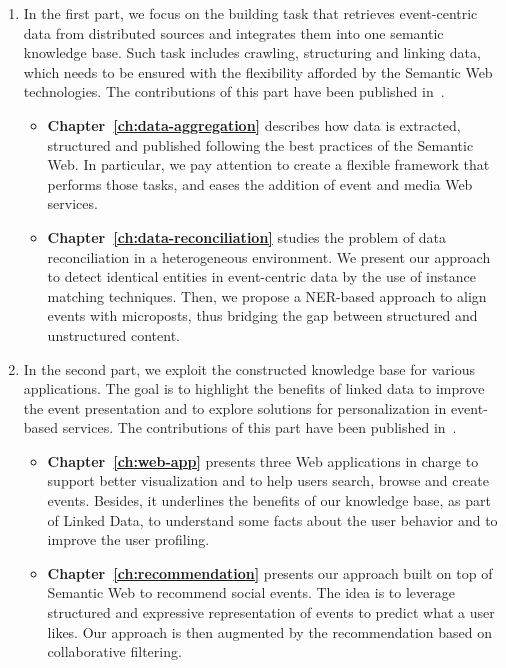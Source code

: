 \begin{enumerate}
\item In the first part, we focus on the building task that retrieves event-centric data from distributed sources and integrates them into one semantic knowledge base. Such task includes crawling, structuring and linking data, which needs to be ensured with the flexibility afforded by the Semantic Web technologies. The contributions of this part have been published in~\cite{Khrouf:OM11,Khrouf:SWJ12,Khrouf:JWS2013,Khrouf:RAMSS12}.

\begin{itemize}
\item \textbf{Chapter~\ref{ch:data-aggregation}} describes how data is extracted, structured and published following the best practices of the Semantic Web. In particular, we pay attention to create a flexible framework that performs those tasks, and eases the addition of event and media Web services.

\item \textbf{Chapter~\ref{ch:data-reconciliation}} studies the problem of data reconciliation in a heterogeneous environment. We present our approach to detect identical entities in event-centric data by the use of instance matching techniques. Then, we propose a NER-based approach to align events with microposts, thus bridging the gap between structured and unstructured content.

\end{itemize}

\item In the second part, we exploit the constructed knowledge base for various applications. The goal is to highlight the benefits of linked data to improve the event presentation and to explore solutions for personalization in event-based services. The contributions of this part have been published in~\cite{Khrouf:ISWC11,Khrouf:ISWC12,Khrouf:ESWC12,Khrouf:RecSys2013}.

\begin{itemize}

\item \textbf{Chapter~\ref{ch:web-app}} presents three Web applications in charge to support better visualization and to help users search, browse and create events. Besides, it underlines the benefits of our knowledge base, as part of Linked Data, to understand some facts about the user behavior and to improve the user profiling.

\item \textbf{Chapter~\ref{ch:recommendation}} presents our approach built on top of Semantic Web to recommend social events. The idea is to leverage structured and expressive representation of events to predict what a user likes. Our approach is then augmented by the recommendation based on collaborative filtering.


\end{itemize}
\end{enumerate}

